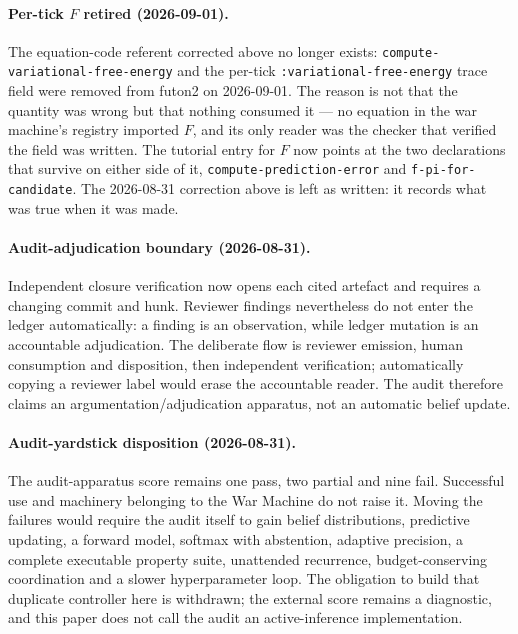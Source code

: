 \paragraph{Per-tick $F$ retired (2026-09-01).}
The equation-code referent corrected above no longer exists: \texttt{compute-variational-free-energy} and the per-tick \texttt{:variational-free-energy} trace field were removed from futon2 on 2026-09-01.  The reason is not that the quantity was wrong but that nothing consumed it --- no equation in the war machine's registry imported $F$, and its only reader was the checker that verified the field was written.  The tutorial entry for $F$ now points at the two declarations that survive on either side of it, \texttt{compute-prediction-error} and \texttt{f-pi-for-candidate}.  The 2026-08-31 correction above is left as written: it records what was true when it was made.

\paragraph{Audit-adjudication boundary (2026-08-31).}
Independent closure verification now opens each cited artefact and requires a changing commit and hunk.  Reviewer findings nevertheless do not enter the ledger automatically: a finding is an observation, while ledger mutation is an accountable adjudication.  The deliberate flow is reviewer emission, human consumption and disposition, then independent verification; automatically copying a reviewer label would erase the accountable reader.  The audit therefore claims an argumentation/adjudication apparatus, not an automatic belief update.

\paragraph{Audit-yardstick disposition (2026-08-31).}
The audit-apparatus score remains one pass, two partial and nine fail.  Successful use and machinery belonging to the War Machine do not raise it.  Moving the failures would require the audit itself to gain belief distributions, predictive updating, a forward model, softmax with abstention, adaptive precision, a complete executable property suite, unattended recurrence, budget-conserving coordination and a slower hyperparameter loop.  The obligation to build that duplicate controller here is withdrawn; the external score remains a diagnostic, and this paper does not call the audit an active-inference implementation.
